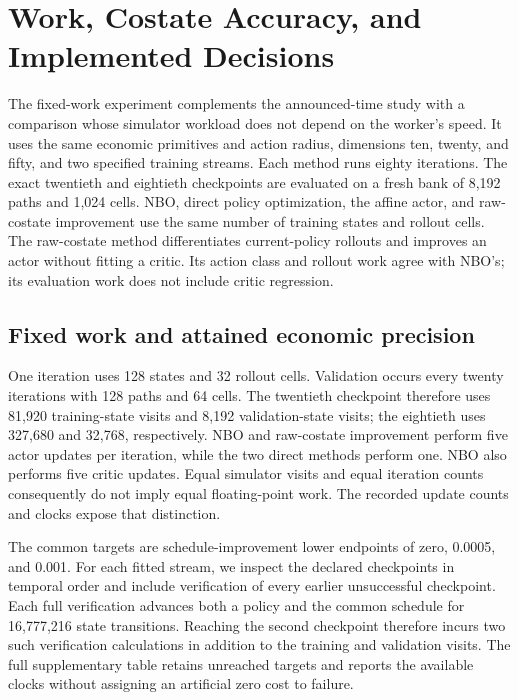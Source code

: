 \section{Work, Costate Accuracy, and Implemented Decisions}\label{sec:r14work}
The fixed-work experiment complements the announced-time study with a comparison whose simulator workload does not depend on the worker's speed. It uses the same economic primitives and action radius, dimensions ten, twenty, and fifty, and two specified training streams. Each method runs eighty iterations. The exact twentieth and eightieth checkpoints are evaluated on a fresh bank of 8,192 paths and 1,024 cells. NBO, direct policy optimization, the affine actor, and raw-costate improvement use the same number of training states and rollout cells. The raw-costate method differentiates current-policy rollouts and improves an actor without fitting a critic. Its action class and rollout work agree with NBO's; its evaluation work does not include critic regression.

\subsection{Fixed work and attained economic precision}
One iteration uses 128 states and 32 rollout cells. Validation occurs every twenty iterations with 128 paths and 64 cells. The twentieth checkpoint therefore uses 81,920 training-state visits and 8,192 validation-state visits; the eightieth uses 327,680 and 32,768, respectively. NBO and raw-costate improvement perform five actor updates per iteration, while the two direct methods perform one. NBO also performs five critic updates. Equal simulator visits and equal iteration counts consequently do not imply equal floating-point work. The recorded update counts and clocks expose that distinction.




The common targets are schedule-improvement lower endpoints of zero, 0.0005, and 0.001. For each fitted stream, we inspect the declared checkpoints in temporal order and include verification of every earlier unsuccessful checkpoint. Each full verification advances both a policy and the common schedule for 16,777,216 state transitions. Reaching the second checkpoint therefore incurs two such verification calculations in addition to the training and validation visits. The full supplementary table retains unreached targets and reports the available clocks without assigning an artificial zero cost to failure.

